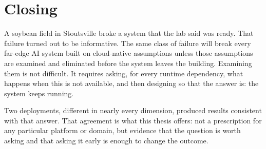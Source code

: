 \section{Closing}
\label{sec:concl_limitations}
A soybean field in Stoutsville broke a system that the lab said was ready. That failure turned out to be informative. The same class of failure will break every far-edge AI system built on cloud-native assumptions unless those assumptions are examined and eliminated before the system leaves the building. Examining them is not difficult. It requires asking, for every runtime dependency, what happens when this is not available, and then designing so that the answer is: the system keeps running.

Two deployments, different in nearly every dimension, produced results consistent with that answer. That agreement is what this thesis offers: not a prescription for any particular platform or domain, but evidence that the question is worth asking and that asking it early is enough to change the outcome.

\nocite{morris2018model,stewart2004profile,morris2016sprint,wang2007autoparam,xu2016blending,deng2012adaptive,kline2024characterizing,dong2025does,bohnett2026understanding,kline2025smartwilds,anthropic2024mcp,chen2023frugalgpt,cornell2021birdnet,ong2024routellm,kim2023prism,wildlifeacoustics2023,wani2025smartwilds,kline2024sec,kline2023acsos,kline2024aaai,kline2024acsos,kline2025wildwing,oquinn2024parallelism,kelley2017answer,morris2018sprinting,kelley2016power,boubin2019agriculture,marble2022,hu2021lora,kholiavchenko2024kabr,dwork2006differential,touvron2023llama,abdin2024phi3,shi2024edge,iqbal2024llmplatform,zheng2024judging,mireshghallah2024llmsecret,shao2024privacyassistants,radosevich2025mcp,errico2025mcp,zhang2025agentsecurity,zhan2025prism,nissenbaum2004privacy,ding2024hybridllm,wang2024privatelora}